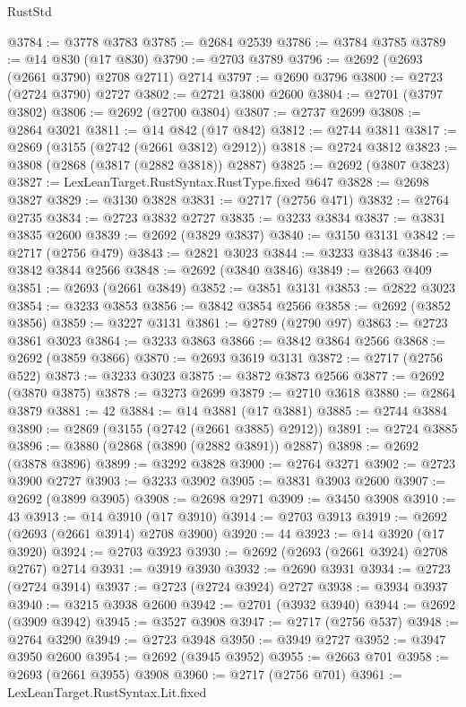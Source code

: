 \begin{lexlean}{RustStd}
\begin{coremodule}
@3784 := @3778 @3783
@3785 := @2684 @2539
@3786 := @3784 @3785
@3789 := @14 @830 (@17 @830)
@3790 := @2703 @3789
@3796 := @2692 (@2693 (@2661 @3790) @2708 @2711) @2714
@3797 := @2690 @3796
@3800 := @2723 (@2724 @3790) @2727
@3802 := @2721 @3800 @2600
@3804 := @2701 (@3797 @3802)
@3806 := @2692 (@2700 @3804)
@3807 := @2737 @2699
@3808 := @2864 @3021
@3811 := @14 @842 (@17 @842)
@3812 := @2744 @3811
@3817 := @2869 (@3155 (@2742 (@2661 @3812) @2912))
@3818 := @2724 @3812
@3823 := @3808 (@2868 (@3817 (@2882 @3818)) @2887)
@3825 := @2692 (@3807 @3823)
@3827 := LexLeanTarget.RustSyntax.RustType.fixed @647
@3828 := @2698 @3827
@3829 := @3130 @3828
@3831 := @2717 (@2756 @471)
@3832 := @2764 @2735
@3834 := @2723 @3832 @2727
@3835 := @3233 @3834
@3837 := @3831 @3835 @2600
@3839 := @2692 (@3829 @3837)
@3840 := @3150 @3131
@3842 := @2717 (@2756 @479)
@3843 := @2821 @3023
@3844 := @3233 @3843
@3846 := @3842 @3844 @2566
@3848 := @2692 (@3840 @3846)
@3849 := @2663 @409
@3851 := @2693 (@2661 @3849)
@3852 := @3851 @3131
@3853 := @2822 @3023
@3854 := @3233 @3853
@3856 := @3842 @3854 @2566
@3858 := @2692 (@3852 @3856)
@3859 := @3227 @3131
@3861 := @2789 (@2790 @97)
@3863 := @2723 @3861 @3023
@3864 := @3233 @3863
@3866 := @3842 @3864 @2566
@3868 := @2692 (@3859 @3866)
@3870 := @2693 @3619 @3131
@3872 := @2717 (@2756 @522)
@3873 := @3233 @3023
@3875 := @3872 @3873 @2566
@3877 := @2692 (@3870 @3875)
@3878 := @3273 @2699
@3879 := @2710 @3618
@3880 := @2864 @3879
@3881 := 42
@3884 := @14 @3881 (@17 @3881)
@3885 := @2744 @3884
@3890 := @2869 (@3155 (@2742 (@2661 @3885) @2912))
@3891 := @2724 @3885
@3896 := @3880 (@2868 (@3890 (@2882 @3891)) @2887)
@3898 := @2692 (@3878 @3896)
@3899 := @3292 @3828
@3900 := @2764 @3271
@3902 := @2723 @3900 @2727
@3903 := @3233 @3902
@3905 := @3831 @3903 @2600
@3907 := @2692 (@3899 @3905)
@3908 := @2698 @2971
@3909 := @3450 @3908
@3910 := 43
@3913 := @14 @3910 (@17 @3910)
@3914 := @2703 @3913
@3919 := @2692 (@2693 (@2661 @3914) @2708 @3900)
@3920 := 44
@3923 := @14 @3920 (@17 @3920)
@3924 := @2703 @3923
@3930 := @2692 (@2693 (@2661 @3924) @2708 @2767) @2714
@3931 := @3919 @3930
@3932 := @2690 @3931
@3934 := @2723 (@2724 @3914)
@3937 := @2723 (@2724 @3924) @2727
@3938 := @3934 @3937
@3940 := @3215 @3938 @2600
@3942 := @2701 (@3932 @3940)
@3944 := @2692 (@3909 @3942)
@3945 := @3527 @3908
@3947 := @2717 (@2756 @537)
@3948 := @2764 @3290
@3949 := @2723 @3948
@3950 := @3949 @2727
@3952 := @3947 @3950 @2600
@3954 := @2692 (@3945 @3952)
@3955 := @2663 @701
@3958 := @2693 (@2661 @3955) @3908
@3960 := @2717 (@2756 @701)
@3961 := LexLeanTarget.RustSyntax.Lit.fixed

\end{coremodule}
\end{lexlean}
